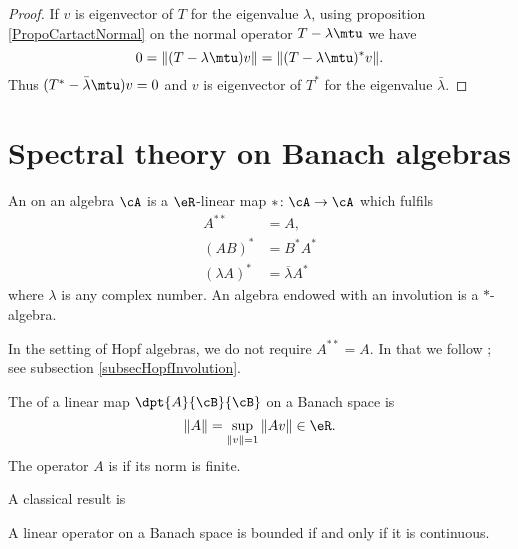 \begin{proof}
    If \( v\) is eigenvector of \( T\) for the eigenvalue \( \lambda\), using proposition \ref{PropoCartactNormal} on the normal operator \( T-\lambda\mtu\) we have
    \begin{equation}
        0=\| (T-\lambda\mtu)v \|=\| (T-\lambda\mtu)^*v \|.
    \end{equation}
    Thus \( (T^*-\bar\lambda \mtu)v=0\) and \( v\) is eigenvector of \( T^*\) for the eigenvalue \( \bar\lambda\).
\end{proof}

\section{Spectral theory on Banach algebras}		\label{Sec_SpecBanach}

\begin{definition}      \label{DefInvolutionALge}
    An  on an algebra $\cA$ is a $\eR$-linear map $*\colon \cA\to \cA$ which fulfils
    \begin{subequations}
    \begin{align}
      A^{**}&=A,\\
        (AB)^*&=B^*A^*\\
        (\lambda A)^*&=\overline{\lambda }A^*
    \end{align}
    \end{subequations}
    where $\lambda$ is any complex number. An algebra endowed with an involution is a $*$-algebra.
\end{definition}

\begin{remark}
    In the setting of Hopf algebras, we do not require \( A^{**}=A\). In that we follow \cite{SoibelmanI}; see subsection \ref{subsecHopfInvolution}.
\end{remark}

\begin{definition}
The  of a linear map $\dpt{A}{\cB}{\cB}$ on a Banach space is 
\[
   \|A\|=\sup_{\|v\|=1}\|Av\|\in\eR.
\]
The operator $A$ is  if its norm is finite. \label{def:normappl}
\end{definition}

A classical result is
\begin{proposition} 
A linear operator on a Banach space is bounded if and only if it is continuous.\label{prop:cont_born}
\end{proposition}

